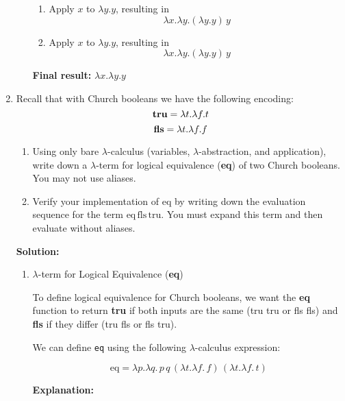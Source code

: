 \documentclass{article}
\begin{document}
\begin{enumerate}
\begin{enumerate}
\begin{enumerate}
            \item Apply \( x \) to \( \lambda y.y \), resulting in \\
\[
\lambda x.\lambda y.(\lambda y.y) \, y
\]

            \item Apply \( x \) to \( \lambda y.y \), resulting in \\
\[
\lambda x.\lambda y.(\lambda y.y) \, y
\]
            
        \end{enumerate}
        
        \textbf{Final result: } \( \lambda x.\lambda y.y \)
    \end{enumerate}



    
    
    \item Recall that with Church booleans we have the following encoding:
    \[
    \textbf{\text{tru}} = \lambda t.\lambda f.t
    \]
    \[
    \textbf{\text{fls}} = \lambda t.\lambda f.f
    \]
    \begin{enumerate}
        \item Using only bare $\lambda$-calculus (variables, $\lambda$-abstraction, and application), write down a $\lambda$-term for logical equivalence (\textbf{eq}) of two Church booleans. You may not use aliases.
        \item Verify your implementation of eq by writing down the evaluation sequence for the term \textbf{$\text{eq} \, \text{fls} \, \text{tru}$}. You must expand this term and then evaluate without aliases.
    \end{enumerate}

    \textbf{Solution:}

    \begin{enumerate}
        \item $\lambda$-term for Logical Equivalence (\textbf{eq})

        To define logical equivalence for Church booleans, we want the \textbf{eq} function to return \textbf{tru} if both inputs are the same (tru tru or fls fls) and \textbf{fls} if they differ (tru fls or fls tru).

        We can define \texttt{eq} using the following $\lambda$-calculus expression:

\[
\text{eq} = \lambda p.\lambda q. \, p \, q \, (\lambda t.\lambda f. \, f) \, (\lambda t.\lambda f. \, t)
\]

    \textbf{Explanation:}


\end{enumerate}
\end{enumerate}
\end{document}
